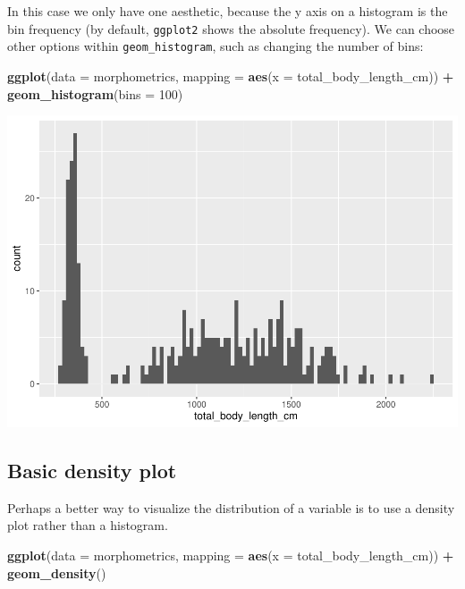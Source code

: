\documentclass[
]{book}
\newenvironment{Shaded}{\begin{snugshade}}{\end{snugshade}}
\newcommand{\AttributeTok}[1]{\textcolor[rgb]{0.13,0.29,0.53}{#1}}
\newcommand{\DecValTok}[1]{\textcolor[rgb]{0.00,0.00,0.81}{#1}}
\newcommand{\FunctionTok}[1]{\textcolor[rgb]{0.13,0.29,0.53}{\textbf{#1}}}
\newcommand{\NormalTok}[1]{#1}
\newcommand{\SpecialCharTok}[1]{\textcolor[rgb]{0.81,0.36,0.00}{\textbf{#1}}}
\begin{document}
In this case we only have one aesthetic, because the y axis on a histogram is
the bin frequency (by default, \texttt{ggplot2} shows the absolute frequency). We can
choose other options within \texttt{geom\_histogram}, such as changing the number of
bins:

\begin{Shaded}
\begin{Highlighting}[]
\FunctionTok{ggplot}\NormalTok{(}\AttributeTok{data =}\NormalTok{ morphometrics, }
       \AttributeTok{mapping =} \FunctionTok{aes}\NormalTok{(}\AttributeTok{x =}\NormalTok{ total\_body\_length\_cm)) }\SpecialCharTok{+}
  \FunctionTok{geom\_histogram}\NormalTok{(}\AttributeTok{bins =} \DecValTok{100}\NormalTok{)}
\end{Highlighting}
\end{Shaded}

\includegraphics{reproducible-science_files/figure-latex/gg5-1.pdf}

\hypertarget{basic-density-plot}{%
\subsection{Basic density plot}\label{basic-density-plot}}

Perhaps a better way to visualize the distribution of a variable is to use a
density plot rather than a histogram.

\begin{Shaded}
\begin{Highlighting}[]
\FunctionTok{ggplot}\NormalTok{(}\AttributeTok{data =}\NormalTok{ morphometrics, }
       \AttributeTok{mapping =} \FunctionTok{aes}\NormalTok{(}\AttributeTok{x =}\NormalTok{ total\_body\_length\_cm)) }\SpecialCharTok{+}
  \FunctionTok{geom\_density}\NormalTok{()}
\end{Highlighting}
\end{Shaded}
\end{document}
